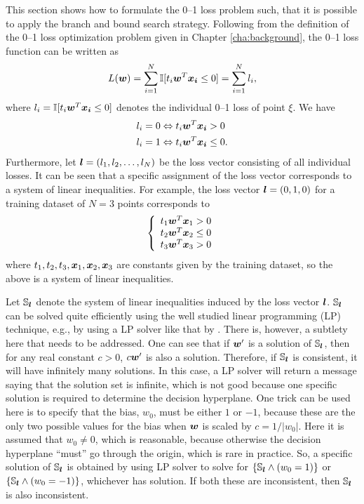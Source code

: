 This section shows how to formulate the 0--1 loss problem such, that it is possible to apply the branch and bound search strategy. Following from the definition of the 0--1 loss optimization problem given in Chapter \ref{cha:background}, the 0--1 loss function can be written as
$$L(\boldsymbol{w}) = \sum_{i=1}^N \mathbb{I} [t_i \boldsymbol{w}^T \boldsymbol{x_i} \leq 0] = \sum_{i=1}^N l_i,$$ 
where $l_i =\mathbb{I} [t_i \boldsymbol{w}^T \boldsymbol{x_i} \leq 0]$ denotes the individual 0--1 loss of point $\xi$. We have
\[ \begin{split}
l_i = 0 &\Leftrightarrow t_i \boldsymbol{w}^T \boldsymbol{x_i} > 0 \\
l_i = 1 &\Leftrightarrow t_i \boldsymbol{w}^T \boldsymbol{x_i} \leq 0. \\
\end{split} \] 
Furthermore, let $\boldsymbol{l}=(l_1, l_2, \dots, l_N)$ be the loss vector consisting of all individual losses. It can be seen that a specific assignment of the loss vector corresponds to a system of linear inequalities. For example, the loss vector $\boldsymbol{l}=(0,1,0)$ for a training dataset of $N=3$ points corresponds to
$$
\left\{
     \begin{array}{l}
       t_1 \boldsymbol{w}^T \boldsymbol{x}_1 > 0\\
       t_2 \boldsymbol{w}^T \boldsymbol{x}_2 \leq 0\\
       t_3 \boldsymbol{w}^T \boldsymbol{x}_3 > 0
     \end{array}
\right.
$$
where $t_1, t_2, t_3, \boldsymbol{x}_1, \boldsymbol{x}_2, \boldsymbol{x}_3$ are constants given by the training dataset, so the above is a system of linear inequalities.  

Let $\mathbb{S}_{\boldsymbol{l}}$ denote the system of linear inequalities induced by the loss vector $\boldsymbol{l}$.  $\mathbb{S}_{\boldsymbol{l}}$ can be solved quite efficiently using the well studied linear programming (LP) technique, e.g., by using a LP solver like that by \cite{lpsolve}. There is, however, a subtlety here that needs to be addressed. One can see that if $\boldsymbol{w}'$ is a solution of $\mathbb{S}_{\boldsymbol{l}}$, then for any real constant $c > 0$,  $c \boldsymbol{w}'$ is also a solution. Therefore, if $\mathbb{S}_{\boldsymbol{l}}$ is consistent, it will have infinitely many solutions. In this case, a LP solver will return a message saying that the solution set is infinite, which is not good because one specific solution is required to determine the decision hyperplane. One trick can be used here is to specify that the bias, $w_0$, must be either $1$ or $-1$, because these are the only two possible values for the bias when $\boldsymbol{w}$ is scaled by $c=1 / |w_0|$. Here it is assumed that $w_0 \not= 0$, which is reasonable, because otherwise  the decision hyperplane ``must'' go through the origin, which is rare in practice. So, a specific solution of $\mathbb{S}_{\boldsymbol{l}}$ is obtained by using LP solver to solve for $\{ \mathbb{S}_{\boldsymbol{l}} \land (w_0=1) \}$ or $\{ \mathbb{S}_{\boldsymbol{l}} \land (w_0=-1) \}$, whichever has solution. If both these are inconsistent, then $\mathbb{S}_{\boldsymbol{l}}$ is also inconsistent.

